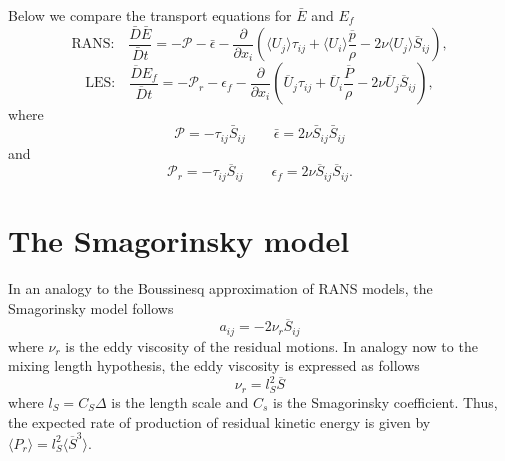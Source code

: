 \documentclass[oneside,a4paper,11pt]{report}
\newcommand{\pavg}{\overline{p}}
\newcommand{\rs}{\tau}          %
\newcommand{\uiavg}{\langle U_i \rangle}
\newcommand{\ujavg}{\langle U_j \rangle}
\newcommand{\ures}{\overline{U}}
\newcommand{\pres}{\overline{P}}
\begin{document}
Below we compare the transport equations for $\bar{E}$ and $E_f$
\begin{equation}
\text{RANS:} \quad \frac{\bar{D} \bar{E}}{\bar{D} t} = - \mathcal{P} - \bar{\epsilon} - \frac{\partial}{\partial x_i} \left ( \ujavg \rs_{ij} + \uiavg \frac{\pavg}{\rho} - 2\nu \ujavg \bar{S}_{ij} \right ),
\end{equation}
\begin{equation}
\text{LES:} \quad \frac{\overline{D} E_f}{ \overline{D} t} = - \mathcal{P}_r - \epsilon_f - \frac{\partial}{\partial x_i} \left ( \ures_j \rs_{ij} + \ures_i \frac{\pres}{\rho} - 2 \nu \ures_j \overline{S}_{ij} \right ) ,
\end{equation}
where 
\begin{equation}
\mathcal{P} = -\rs_{ij} \bar{S}_{ij} \qquad \bar{\epsilon} = 2 \nu \bar{S}_{ij} \bar{S}_{ij}
\end{equation}
and
\begin{equation}
\mathcal{P}_r = -\rs_{ij} \overline{S}_{ij} \qquad \epsilon_f = 2 \nu \overline{S}_{ij} \overline{S}_{ij}.
\end{equation}

\section{The Smagorinsky model}
In an analogy to the Boussinesq approximation of RANS models, the Smagorinsky model follows
\begin{equation}
a_{ij} = -2 \nu_r \overline{S}_{ij}
\end{equation}
where $\nu_r$ is the eddy viscosity of the residual motions. In analogy now to the mixing length hypothesis, the eddy viscosity is expressed as follows
\begin{equation}
\nu_r = l_S^2 \overline{S}
\end{equation}
where $l_S = C_S \Delta$ is the length scale and $C_s$ is the Smagorinsky coefficient. Thus, the expected rate of production of residual kinetic energy is given by $\langle P_r \rangle = l_S^2 \langle \overline{S}^3 \rangle$.
\end{document}

